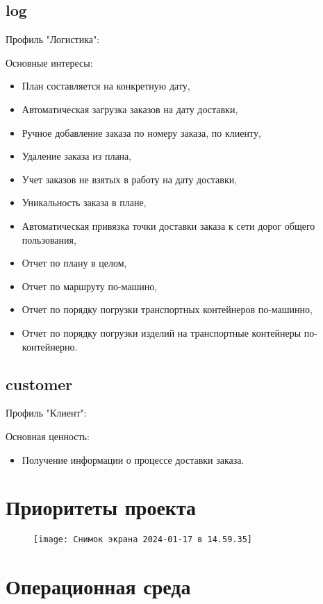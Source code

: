 \subsection{log}
\label{subsec:log}
Профиль "Логистика":

Основные интересы:
\begin{itemize}
    \item План составляется на конкретную дату,
    \item Автоматическая загрузка заказов на дату доставки,
    \item Ручное добавление заказа по номеру заказа, по клиенту,
    \item Удаление заказа из плана,
    \item Учет заказов не взятых в работу на дату доставки,
    \item Уникальность заказа в плане,
    \item Автоматическая привязка точки доставки заказа к сети дорог общего пользования,
    \item Отчет по плану в целом,
    \item Отчет по маршруту по-машино,
    \item Отчет по порядку погрузки транспортных контейнеров по-машинно,
    \item Отчет по порядку погрузки изделий на транспортные контейнеры по-контейнерно.
\end{itemize}

\subsection{customer}
\label{subsec:customer}
Профиль "Клиент":

Основная ценность:
\begin{itemize}
    \item Получение информации о процессе доставки заказа.
\end{itemize}


\section{Приоритеты проекта}
\label{sec:priorities}

\begin{figure}
    \centering
    \texttt{[image: Снимок экрана 2024-01-17 в 14.59.35]}
    \label{fig:}
\end{figure}


\section{Операционная среда}
\label{sec:env}


